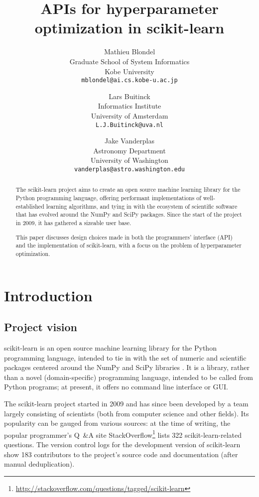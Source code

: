 \documentclass[a4paper,twocolumn]{article}
\title{APIs for hyperparameter optimization in scikit-learn}
\author{Mathieu Blondel \\
        Graduate School of System Informatics \\
        Kobe University \\
        \small{\texttt{mblondel@ai.cs.kobe-u.ac.jp}}
      \and
        Lars Buitinck \\
        Informatics Institute \\
        University of Amsterdam \\
        \small{\texttt{L.J.Buitinck@uva.nl}}
      \and
        Jake Vanderplas \\
        Astronomy Department \\
        University of Washington \\
        \small{\texttt{vanderplas@astro.washington.edu}}
}
\begin{document}
\maketitle

\begin{abstract}
The scikit-learn project aims to create an open source
machine learning library for the Python programming language,
offering performant implementations of well-established learning algorithms,
and tying in with the ecosystem of scientific software
that has evolved around the NumPy and SciPy packages.
Since the start of the project in 2009,
it has gathered a sizeable user base.

This paper discusses design choices made
in both the programmers' interface (API) and the implementation
of scikit-learn,
with a focus on the problem of hyperparameter optimization.
\end{abstract}

\section{Introduction}

\subsection{Project vision}

scikit-learn \citep{pedregosa2011} is an open source machine learning library
for the Python programming language,
intended to tie in with the set of numeric and scientific packages
centered around the NumPy and SciPy libraries
.
It is a library, rather than a novel (domain-specific) programming language,
intended to be called from Python programs;
at present, it offers no command line interface or GUI.

The scikit-learn project started in 2009 and has since been developed
by a team largely consisting of scientists
(both from computer science and other fields).
Its popularity can be gauged from various sources:
at the time of writing,
the popular programmer's Q~\&{}A site StackOverflow\footnote{
  \url{http://stackoverflow.com/questions/tagged/scikit-learn}}
lists 322 scikit-learn-related questions.
The version control logs for the development version of scikit-learn
show 183 contributors to the project's source code and documentation
(after manual deduplication).
\end{document}
